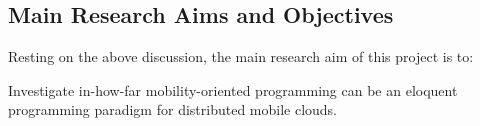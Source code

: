 \subsection{Main Research Aims and Objectives}

Resting on the above discussion, the main research aim of this project
is to:

\label{research-aim}\newcommand{\researchAim}{\begin{research-aim}
Investigate in-how-far mobility-oriented programming can be an
eloquent programming paradigm for distributed mobile
clouds.\end{research-aim}}\researchAim{}











